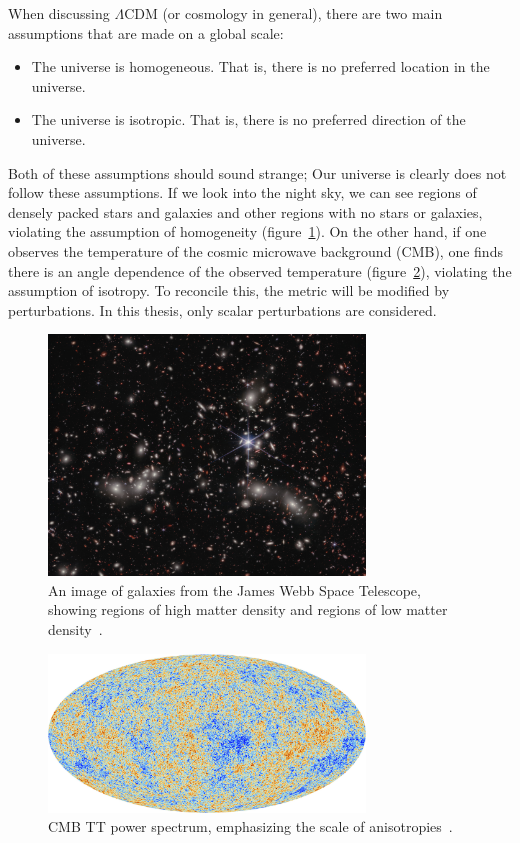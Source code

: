 When discussing $\Lambda$CDM (or cosmology in general), there are two main assumptions that are made on a global scale:
\begin{itemize}
    \item The universe is homogeneous. That is, there is no preferred location in the universe.
    \item The universe is isotropic. That is, there is no preferred direction of the universe.
\end{itemize}
Both of these assumptions should sound strange; Our universe is clearly does not follow these assumptions. If we look into the night sky, we can see regions of densely packed stars and galaxies and other regions with no stars or galaxies, violating the assumption of homogeneity (figure~\ref{fig:galaxy_map}). On the other hand, if one observes the temperature of the cosmic microwave background (CMB), one finds there is an angle dependence of the observed temperature (figure~\ref{fig:cmb_tt_map}), violating the assumption of isotropy. To reconcile this, the metric will be modified by perturbations. In this thesis, only scalar perturbations are considered.
\begin{figure}[ht]
    \centering
    \includegraphics[width=0.75\textwidth]{plots/weic2305a.jpg}
    \caption{An image of galaxies from the James Webb Space Telescope, showing regions of high matter density and regions of low matter density~\cite{webb_clusters}.}
    \label{fig:galaxy_map}
\end{figure}
\begin{figure}[ht]
    \centering
    \includegraphics[width=0.75\textwidth]{plots/Planck_CMB.jpg}
    \caption{CMB TT power spectrum, emphasizing the scale of anisotropies~\cite{planck_CMB}.}
    \label{fig:cmb_tt_map}
\end{figure}

